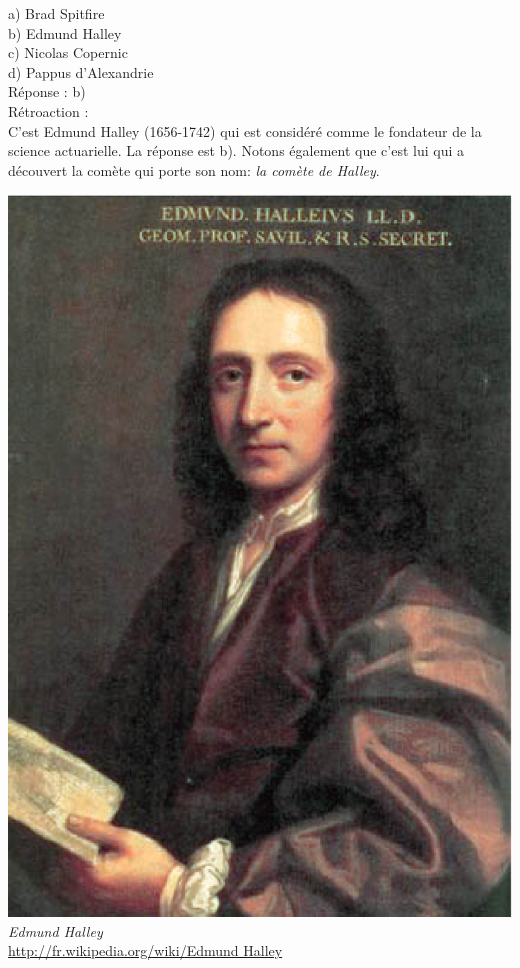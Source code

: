 \documentclass[letterpaper, 12pt]{article}
\begin{document}
a) Brad Spitfire\\
b) Edmund Halley\\
c) Nicolas Copernic\\
d) Pappus d'Alexandrie\\

R\'eponse : b)\\

R\'etroaction :\\
C'est Edmund Halley (1656-1742) qui est consid\'er\'e comme le fondateur de la science actuarielle. La r\'eponse est b). Notons \'egalement que c'est lui qui a d\'ecouvert la com\`ete qui porte son nom: \og \emph{la com\`ete de Halley}\fg.
\begin{center}
\includegraphics[scale=0.2]{Halley.eps}\\
\emph{{\small Edmund Halley}}\\
\href{http://fr.wikipedia.org/wiki/Edmund_Halley}{http://fr.wikipedia.org/wiki/Edmund Halley}\\[5mm]
\end{center}
\end{document}
